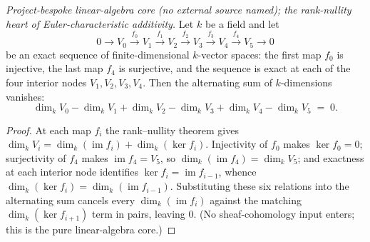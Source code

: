 \begin{lemma}

  \label{lem:finrank_alternating_six_term}
  \textit{Project-bespoke linear-algebra core (no external source named);
  the rank-nullity heart of Euler-characteristic additivity.}
  Let \(k\) be a field and let
  \[
    0 \to V_0 \xrightarrow{f_0} V_1 \xrightarrow{f_1} V_2
      \xrightarrow{f_2} V_3 \xrightarrow{f_3} V_4
      \xrightarrow{f_4} V_5 \to 0
  \]
  be an exact sequence of finite-dimensional \(k\)-vector spaces: the
  first map \(f_0\) is injective, the last map \(f_4\) is surjective, and
  the sequence is exact at each of the four interior nodes
  \(V_1, V_2, V_3, V_4\). Then the alternating sum of \(k\)-dimensions
  vanishes:
  \[
    \dim_k V_0 - \dim_k V_1 + \dim_k V_2
      - \dim_k V_3 + \dim_k V_4 - \dim_k V_5 \;=\; 0.
  \]
\end{lemma}

\begin{proof}
  At each map \(f_i\) the rank--nullity theorem gives
  \(\dim_k V_i = \dim_k(\operatorname{im} f_i) + \dim_k(\ker f_i)\).
  Injectivity of \(f_0\) makes \(\ker f_0 = 0\); surjectivity of \(f_4\)
  makes \(\operatorname{im} f_4 = V_5\), so \(\dim_k(\operatorname{im} f_4)
  = \dim_k V_5\); and exactness at each interior node identifies
  \(\ker f_i = \operatorname{im} f_{i-1}\), whence
  \(\dim_k(\ker f_i) = \dim_k(\operatorname{im} f_{i-1})\). Substituting
  these six relations into the alternating sum cancels every
  \(\dim_k(\operatorname{im} f_i)\) against the matching
  \(\dim_k(\ker f_{i+1})\) term in pairs, leaving \(0\). (No
  sheaf-cohomology input enters; this is the pure linear-algebra core.)
\end{proof}

